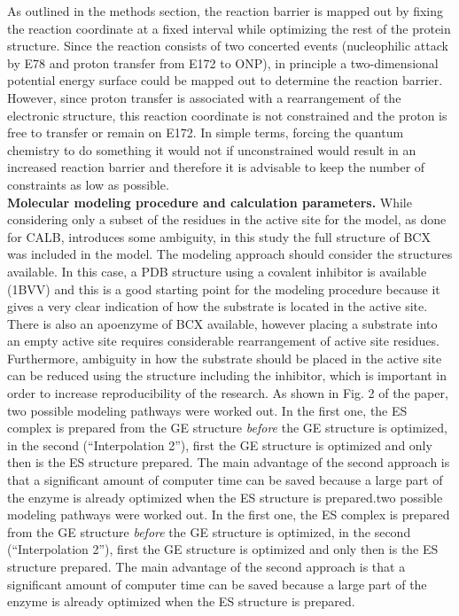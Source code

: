 As outlined in the methods section, the reaction barrier is mapped out by fixing the reaction coordinate at a fixed interval while optimizing the rest of the protein structure.
Since the reaction consists of two concerted events (nucleophilic attack by E78 and proton transfer from E172 to ONP), in principle a two-dimensional potential energy surface could be mapped out to determine the reaction barrier.
However, since proton transfer is associated with a rearrangement of the electronic structure, this reaction coordinate is not constrained and the proton is free to transfer or remain on E172.
In simple terms, forcing the quantum chemistry to do something it would not if unconstrained would result in an increased reaction barrier and therefore it is advisable to keep the number of constraints as low as possible.\\
\textbf{Molecular modeling procedure and calculation parameters.}
While considering only a subset of the residues in the active site for the model, as done for CALB, introduces some ambiguity, in this study the full structure of BCX was included in the model.
The modeling approach should consider the structures available.
In this case, a PDB structure using a covalent inhibitor is available (1BVV) and this is a good starting point for the modeling procedure because it gives a very clear indication of how the substrate is located in the active site.
There is also an apoenzyme of BCX available, however placing a substrate into an empty active site requires considerable rearrangement of active site residues.
Furthermore, ambiguity in how the substrate should be placed in the active site can be reduced using the structure including the inhibitor, which is important in order to increase reproducibility of the research.
As shown in Fig. 2 of the paper, two possible modeling pathways were worked out.
In the first one, the ES complex is prepared from the GE structure \textit{before} the GE structure is optimized, in the second (``Interpolation 2''), first the GE structure is optimized and only then is the ES structure prepared.
The main advantage of the second approach is that a significant amount of computer time can be saved because a large part of the enzyme is already optimized when the ES structure is prepared.two possible modeling pathways were worked out.
In the first one, the ES complex is prepared from the GE structure \textit{before} the GE structure is optimized, in the second (``Interpolation 2''), first the GE structure is optimized and only then is the ES structure prepared.
The main advantage of the second approach is that a significant amount of computer time can be saved because a large part of the enzyme is already optimized when the ES structure is prepared.
